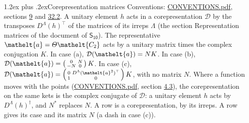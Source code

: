 \documentclass[10pt,a4paper]{article}
\makeatletter
\renewcommand\section{\@startsection{section}{1}{\z@}{-3ex plus -1ex minus -.2ex}%
  {1.2ex plus .2ex}{\normalfont\large\sffamily\bfseries\color{parttitle}}}
\numberwithin{equation}{section}
\newcommand{\eltfont}[1]{{\let\sigma\eltsigma\mathelt{#1}}}
\newcommand{\grp}[1]{\mathsf{#1}}
\newcommand{\elt}[1]{\eltfont{#1}}
\makeatother
\begin{document}
\section{Corepresentation matrices}\label{s:corep_matrices}
Conventions: \href{../../CONVENTIONS.pdf}{CONVENTIONS.pdf}, sections \href{../../../rotation/CONVENTIONS.pdf\#conv.9}{9} and \href{../../CONVENTIONS.pdf\#conv.32.2}{32.2}.
A unitary element $h$ acts in a corepresentation $\mathcal{D}$ by the transposes $D^{\Lambda}(h)^{\top}$ of the matrices of its irreps $\Lambda$ (the section Representation matrices of the document of \href{../../../rotation/data/pdf/S10.pdf}{$\grp{S_{10}}$}). The representative $\elt{a} = \varTheta\elt{C_{2}}$ acts by a unitary matrix times the complex conjugation $K$.
In case (a), $\mathcal{D}(\elt{a}) = NK$. In case (b), $\mathcal{D}(\elt{a}) = \left(\begin{smallmatrix} 0 & N \\ -N & 0 \end{smallmatrix}\right) K$. In case (c), $\mathcal{D}(\elt{a}) = \left(\begin{smallmatrix} 0 & D^{\Lambda}(\elt{a}^2)^{\top} \\ 1 & 0 \end{smallmatrix}\right) K$, with no matrix $N$.
Where a function moves with the points (\href{../../CONVENTIONS.pdf}{CONVENTIONS.pdf}, section \href{../../../rotation/CONVENTIONS.pdf\#conv.4.3}{4.3}), the corepresentation on the same kets is the complex conjugate of $\mathcal{D}$: a unitary element $h$ acts by $D^{\Lambda}(h)^{\dagger}$, and $N^{*}$ replaces $N$.
A row is a corepresentation, by its irreps. A row gives its case and its matrix $N$ (a dash in case (c)).
\end{document}
